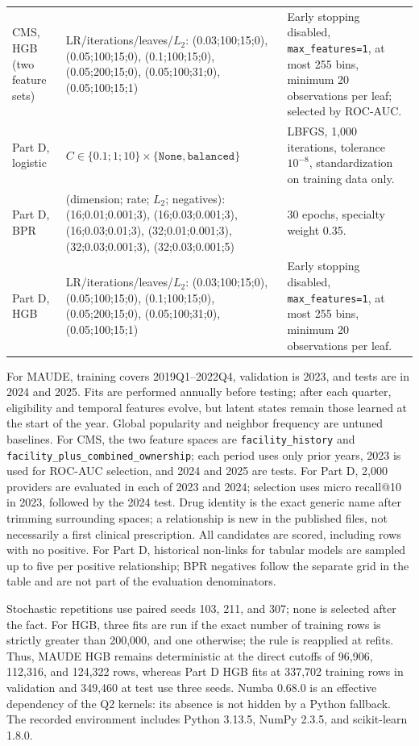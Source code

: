 \begin{longtable}{@{}p{26mm}p{68mm}p{48mm}@{}}
CMS, HGB (two feature sets) & LR/iterations/leaves/$L_2$: (0.03;100;15;0), (0.05;100;15;0), (0.1;100;15;0), (0.05;200;15;0), (0.05;100;31;0), (0.05;100;15;1) & Early stopping disabled, \texttt{max\_features=1}, at most 255 bins, minimum 20 observations per leaf; selected by ROC-AUC.\\
Part D, logistic & $C\in\{0.1;1;10\}\times\{\texttt{None},\texttt{balanced}\}$ & LBFGS, 1,000 iterations, tolerance $10^{-8}$, standardization on training data only.\\
Part D, BPR & (dimension; rate; $L_2$; negatives): (16;0.01;0.001;3), (16;0.03;0.001;3), (16;0.03;0.01;3), (32;0.01;0.001;3), (32;0.03;0.001;3), (32;0.03;0.001;5) & 30 epochs, specialty weight 0.35.\\
Part D, HGB & LR/iterations/leaves/$L_2$: (0.03;100;15;0), (0.05;100;15;0), (0.1;100;15;0), (0.05;200;15;0), (0.05;100;31;0), (0.05;100;15;1) & Early stopping disabled, \texttt{max\_features=1}, at most 255 bins, minimum 20 observations per leaf.\\
\bottomrule
\end{longtable}

For MAUDE, training covers 2019Q1--2022Q4, validation is 2023, and tests are in 2024 and 2025. Fits are performed annually before testing; after each quarter, eligibility and temporal features evolve, but latent states remain those learned at the start of the year. Global popularity and neighbor frequency are untuned baselines. For CMS, the two feature spaces are \texttt{facility\_history} and \texttt{facility\_plus\_combined\_ownership}; each period uses only prior years, 2023 is used for ROC-AUC selection, and 2024 and 2025 are tests. For Part D, 2,000 providers are evaluated in each of 2023 and 2024; selection uses micro recall@10 in 2023, followed by the 2024 test. Drug identity is the exact generic name after trimming surrounding spaces; a relationship is new in the published files, not necessarily a first clinical prescription. All candidates are scored, including rows with no positive.
For Part D, historical non-links for tabular models are sampled up to five per positive relationship; BPR negatives follow the separate grid in the table and are not part of the evaluation denominators.

Stochastic repetitions use paired seeds 103, 211, and 307; none is selected after the fact. For HGB, three fits are run if the exact number of training rows is strictly greater than 200,000, and one otherwise; the rule is reapplied at refits. Thus, MAUDE HGB remains deterministic at the direct cutoffs of 96,906, 112,316, and 124,322 rows, whereas Part D HGB fits at 337,702 training rows in validation and 349,460 at test use three seeds. Numba 0.68.0 is an effective dependency of the Q2 kernels: its absence is not hidden by a Python fallback. The recorded environment includes Python 3.13.5, NumPy 2.3.5, and scikit-learn 1.8.0.

